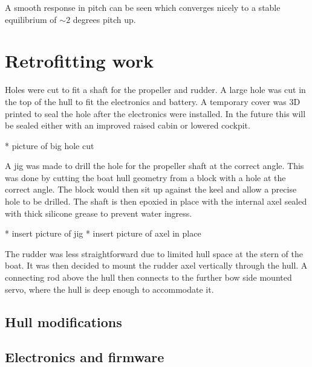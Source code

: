 \documentclass{article}
\begin{document}
A smooth response in pitch can be seen which converges nicely to a stable equilibrium of $\sim2$ degrees pitch up.



\section{Retrofitting work}

Holes were cut to fit a shaft for the propeller and rudder.
A large hole was cut in the top of the hull to fit the electronics and battery.
A temporary cover was 3D printed to seal the hole after the electronics were installed.
In the future this will be sealed either with an improved raised cabin or lowered cockpit.

* picture of big hole cut

A jig was made to drill the hole for the propeller shaft at the correct angle.
This was done by cutting the boat hull geometry from a block with a hole at the correct angle.
The block would then sit up against the keel and allow a precise hole to be drilled.
The shaft is then epoxied in place with the internal axel sealed with thick silicone grease to prevent water ingress.

* insert picture of jig
* insert picture of axel in place

The rudder was less straightforward due to limited hull space at the stern of the boat.
It was then decided to mount the rudder axel vertically through the hull.
A connecting rod above the hull then connects to the further bow side mounted servo, where the hull is deep enough to accommodate it.


\subsection{Hull modifications}

\subsection{Electronics and firmware}
\end{document}
